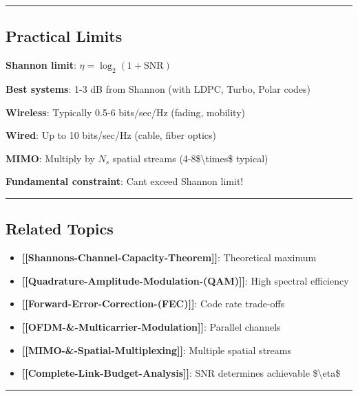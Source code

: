 \begin{center}\rule{0.5\linewidth}{0.5pt}\end{center}

\subsection{Practical Limits}\label{practical-limits}

\textbf{Shannon limit}: \(\eta = \log_2(1 + \text{SNR})\)

\textbf{Best systems}: 1-3 dB from Shannon (with LDPC, Turbo, Polar
codes)

\textbf{Wireless}: Typically 0.5-6 bits/sec/Hz (fading, mobility)

\textbf{Wired}: Up to 10 bits/sec/Hz (cable, fiber optics)

\textbf{MIMO}: Multiply by \(N_s\) spatial streams
(4-8\$\textbackslash times\$ typical)

\textbf{Fundamental constraint}: Can\textquotesingle t exceed Shannon
limit!

\begin{center}\rule{0.5\linewidth}{0.5pt}\end{center}

\subsection{Related Topics}\label{related-topics}

\begin{itemize}
\tightlist
\item
  \textbf{{[}{[}Shannon\textquotesingle s-Channel-Capacity-Theorem{]}{]}}:
  Theoretical maximum
\item
  \textbf{{[}{[}Quadrature-Amplitude-Modulation-(QAM){]}{]}}: High
  spectral efficiency
\item
  \textbf{{[}{[}Forward-Error-Correction-(FEC){]}{]}}: Code rate
  trade-offs
\item
  \textbf{{[}{[}OFDM-\&-Multicarrier-Modulation{]}{]}}: Parallel
  channels
\item
  \textbf{{[}{[}MIMO-\&-Spatial-Multiplexing{]}{]}}: Multiple spatial
  streams
\item
  \textbf{{[}{[}Complete-Link-Budget-Analysis{]}{]}}: SNR determines
  achievable \$\textbackslash eta\$
\end{itemize}

\begin{center}\rule{0.5\linewidth}{0.5pt}\end{center}

